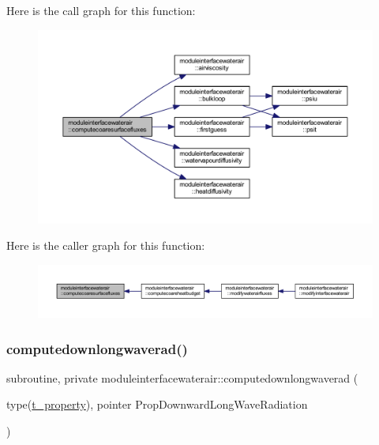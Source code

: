 Here is the call graph for this function\+:\nopagebreak
\begin{figure}[H]
\begin{center}
\leavevmode
\includegraphics[width=350pt]{namespacemoduleinterfacewaterair_a542e31b196bb8758541444a1a4f7bd77_cgraph}
\end{center}
\end{figure}
Here is the caller graph for this function\+:\nopagebreak
\begin{figure}[H]
\begin{center}
\leavevmode
\includegraphics[width=350pt]{namespacemoduleinterfacewaterair_a542e31b196bb8758541444a1a4f7bd77_icgraph}
\end{center}
\end{figure}
\mbox{\label{namespacemoduleinterfacewaterair_ae3df7c61e2dbd50895d272ec3bdb3d28}} 
\subsubsection{\texorpdfstring{computedownlongwaverad()}{computedownlongwaverad()}}
{\footnotesize\ttfamily subroutine, private moduleinterfacewaterair\+::computedownlongwaverad (\begin{DoxyParamCaption}\item[{type(\mbox{\hyperlink{structmoduleinterfacewaterair_1_1t__property}{t\+\_\+property}}), pointer}]{Prop\+Downward\+Long\+Wave\+Radiation }\end{DoxyParamCaption})\hspace{0.3cm}{\ttfamily [private]}}

